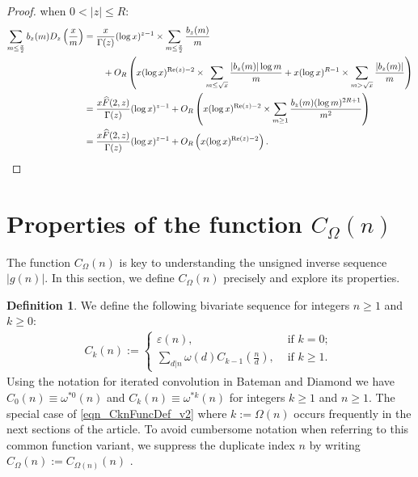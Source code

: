 \documentclass[11pt,reqno,a4letter]{article}
\numberwithin{equation}{section}
\numberwithin{figure}{section}
\numberwithin{table}{section}
\newcommand{\seqnum}[1]{\href{http://oeis.org/#1}{\color{ProcessBlue}{\underline{#1}}}}
\theoremstyle{plain}
\numberwithin{theorem}{section}
\theoremstyle{definition}
\newtheorem{definition}[theorem]{Definition}
\renewcommand{\Re}{\operatorname{Re}}
\begin{document}
\begin{proof}
when $0 < |z| \leq R$: 
\begin{align*} 
\sum_{m \leq \frac{x}{2}} b_z(m) D_z\left(\frac{x}{m}\right) & = \frac{x}{\Gamma(z)} (\log x)^{z-1} \times 
     \sum_{m \leq \frac{x}{2}} \frac{b_z(m)}{m} \\ 
     & \phantom{=\quad\ } + 
     O_R\left(x (\log x)^{\Re(z)-2} \times \sum_{m \leq \sqrt{x}} \frac{|b_z(m)| \log m}{m} + 
     x (\log x)^{R-1} \times \sum_{m > \sqrt{x}} \frac{|b_z(m)|}{m}\right) \\ 
     & = \frac{x \widehat{F}(2, z)}{\Gamma(z)} (\log x)^{z-1} + O_R\left( 
     x (\log x)^{\Re(z)-2} \times \sum_{m \geq 1} \frac{b_z(m) (\log m)^{2R+1}}{m^2} 
     \right) \\ 
     & = \frac{x \widehat{F}(2, z)}{\Gamma(z)} (\log x)^{z-1} + O_{R}\left( 
     x (\log x)^{\Re(z)-2}\right). 
     \qedhere  
\end{align*} 
\end{proof} 

\section{Properties of the function $C_{\Omega}(n)$} 
\label{Section_NewFormulasForgInvn_v1} 

The function $C_{\Omega}(n)$ is key to understanding the 
unsigned inverse sequence $|g(n)|$. In this section, we define $C_{\Omega}(n)$ 
precisely and explore its properties. 

\begin{definition}
We define the following bivariate sequence for integers $n \geq 1$ and $k \geq 0$: 
\begin{align} 
\label{eqn_CknFuncDef_v2} 
C_k(n) := \begin{cases} 
     \varepsilon(n), & \text{ if $k = 0$; } \\ 
     \sum\limits_{d|n} \omega(d) C_{k-1}\left(\frac{n}{d}\right), & \text{ if $k \geq 1$. } 
     \end{cases} 
\end{align} 
Using the notation for iterated convolution in 
Bateman and Diamond \cite[Def.~ 2.3; \S 2]{ANT-BATEMAN-DIAMOND} we have 
$C_0(n) \equiv \omega^{\ast 0}(n)$ and $C_k(n) \equiv \omega^{\ast k}(n)$ for 
integers $k \geq 1$ and $n \geq 1$. 
The special case of \eqref{eqn_CknFuncDef_v2} where 
$k := \Omega(n)$ occurs frequently in the next sections of the 
article. To avoid cumbersome notation when referring to this common function variant, we suppress the 
duplicate index $n$ by writing $C_{\Omega}(n) := C_{\Omega(n)}(n)$ \cite[\seqnum{A008480}]{OEIS}. 
\end{definition}
\end{document}
